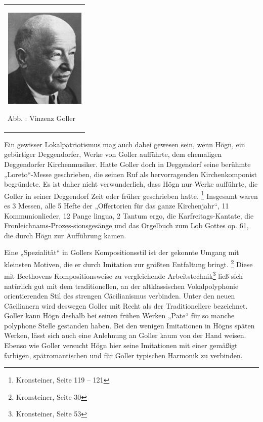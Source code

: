 \documentclass[a4paper]{article}
\newcounter{Abb}
\renewcommand\theAbb{\arabic{Abb}}
\begin{document}
\begin{center}
\begin{minipage}{4.249cm}
\begin{flushleft}
\tablefirsthead{}
\tablehead{}
\tabletail{}
\tablelasttail{}
\begin{supertabular}{m{4.0490003cm}}

\includegraphics[width=3.866cm,height=4.773cm]{pictures/zulassungsarbeit-img089.jpg}

Abb. \stepcounter{Abb}{\theAbb}: Vinzenz Goller\\
\end{supertabular}
\end{flushleft}
\end{minipage}
\end{center}
Ein gewisser Lokalpatriotismus mag auch dabei gewesen sein, wenn Högn,
ein gebürtiger Deggendorfer, Werke von Goller aufführte, dem ehemaligen
Deggendorfer Kirchenmusiker. Hatte Goller doch in Deggendorf seine
berühmte „Loreto“-Messe geschrieben, die seinen Ruf als hervorragenden
Kirchenkomponist begründete. Es ist daher nicht verwunderlich, dass
Högn nur Werke aufführte, die Goller in seiner Deggendorf Zeit oder
früher geschrieben hatte. \footnote{Kronsteiner, Seite 119 – 121}
Insgesamt waren es 3 Messen, alle 5 Hefte der „Offertorien für das
ganze Kirchenjahr“, 11 Kommunionlieder, 12 Pange
lingua,\textcolor[rgb]{0.6,0.6,0.6}{ }2 Tantum ergo, die
Karfreitags-Kantate, die Fronleichnams-Prozes-sionsgesänge und das
Orgelbuch zum Lob Gottes op. 61, die durch Högn zur Aufführung kamen.

Eine „Spezialität“ in Gollers Kompositionsstil ist der gekonnte Umgang
mit kleinsten Motiven, die er durch Imitation zur größten Entfaltung
bringt. \footnote{Kronsteiner, Seite 30} Diese mit Beethovens
Kompositionsweise zu vergleichende Arbeitstechnik\footnote{
Kronsteiner, Seite 53} ließ sich natürlich gut mit dem traditionellen,
an der altklassischen Vokalpolyphonie orientierenden Stil des strengen
Cäcilianismus verbinden. Unter den neuen Cäcilianern wird deswegen
Goller mit Recht als der Traditionellere bezeichnet. Goller kann Högn
deshalb bei seinen frühen Werken „Pate“ für so manche polyphone Stelle
gestanden haben. Bei den wenigen Imitationen in Högns späten Werken,
lässt sich auch eine Anlehnung an Goller kaum von der Hand weisen.
Ebenso wie Goller versucht Högn hier seine Imitationen mit einer
gemäßigt farbigen, spätromantischen und für Goller typischen Harmonik
zu verbinden.
\end{document}
